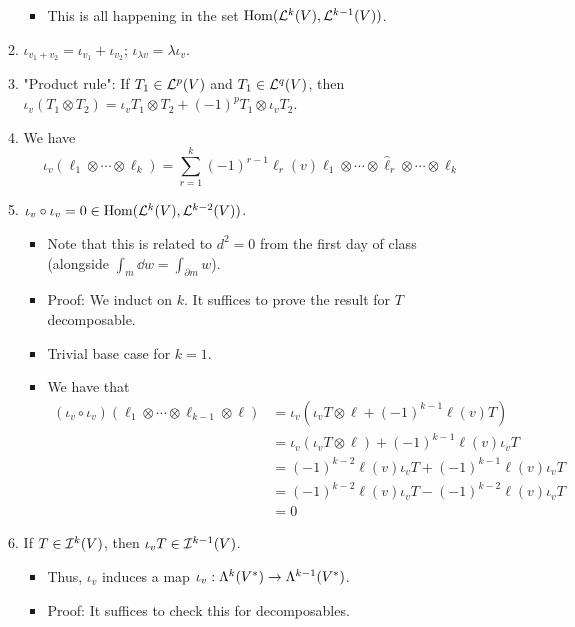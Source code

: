 \documentclass[../notes.tex]{subfiles}
\begin{document}
\begin{itemize}
\begin{enumerate}
\begin{itemize}
            \item This is all happening in the set $\Hom(\lin[k]{V},\lin[k-1]{V})$.
        \end{itemize}
        \item $\iota_{v_1+v_2}=\iota_{v_1}+\iota_{v_2}$; $\iota_{\lambda v}=\lambda\iota_v$.
        \item "Product rule": If $T_1\in\lin[p]{V}$ and $T_1\in\lin[q]{V}$, then $\iota_v(T_1\otimes T_2)=\iota_vT_1\otimes T_2+(-1)^pT_1\otimes\iota_vT_2$.
        \item We have
        \begin{equation*}
            \iota_v(\ell_1\otimes\cdots\otimes\ell_k) = \sum_{r=1}^k(-1)^{r-1}\ell_r(v)\ell_1\otimes\cdots\otimes\hat{\ell}_r\otimes\cdots\otimes\ell_k
        \end{equation*}
        \item $\iota_v\circ\iota_v=0\in\Hom(\lin[k]{V},\lin[k-2]{V})$.
        \begin{itemize}
            \item Note that this is related to $d^2=0$ from the first day of class (alongside $\int_m\dd{w}=\int_{\partial m}w$).
            \item Proof: We induct on $k$. It suffices to prove the result for $T$ decomposable.
            \item Trivial base case for $k=1$.
            \item We have that
            \begin{align*}
                (\iota_v\circ\iota_v)(\ell_1\otimes\cdots\otimes\ell_{k-1}\otimes\ell) &= \iota_v(\iota_vT\otimes\ell+(-1)^{k-1}\ell(v)T)\\
                &= \iota_v(\iota_vT\otimes\ell)+(-1)^{k-1}\ell(v)\iota_vT\\
                &= (-1)^{k-2}\ell(v)\iota_vT+(-1)^{k-1}\ell(v)\iota_vT\\
                &= (-1)^{k-2}\ell(v)\iota_vT-(-1)^{k-2}\ell(v)\iota_vT\\
                &= 0
            \end{align*}
        \end{itemize}
        \item If $T\in\ide[k]{V}$, then $\iota_vT\in\ide[k-1]{V}$.
        \begin{itemize}
            \item Thus, $\iota_v$ induces a map $\iota_v:\lam[k]{V^*}\to\lam[k-1]{V^*}$.
            \item Proof: It suffices to check this for decomposables.

\end{itemize}
\end{enumerate}
\end{itemize}
\end{document}
